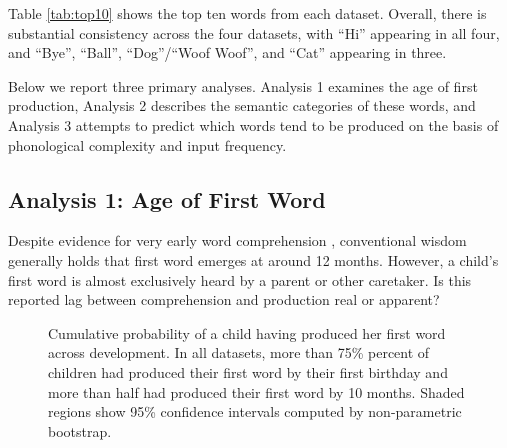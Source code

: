 \documentclass[10pt,letterpaper]{article}
\begin{document}
Table \ref{tab:top10} shows the top ten words from each dataset. Overall, there is substantial consistency across the four datasets, with ``Hi'' appearing in all four, and ``Bye'', ``Ball'', ``Dog''/``Woof Woof'', and ``Cat'' appearing in three.

Below we report three primary analyses. Analysis 1 examines the age of first production, Analysis 2 describes the semantic categories of these words, and Analysis 3 attempts to predict which words tend to be produced on the basis of phonological complexity and input frequency.

\subsection{Analysis 1: Age of First Word} 

Despite evidence for very early word comprehension \cite{tincoff2012,bergelson2012}, conventional wisdom generally holds that first word emerges at around 12 months. However, a child's first word is almost exclusively heard by a parent or other caretaker. Is this reported lag between comprehension and production real or apparent? 



\begin{figure}[t]
\caption{\label{fig:cdfs} Cumulative probability of a child having produced her first word across development. In all datasets, more than 75\% percent of children had produced their first word by their first birthday and more than half had produced their first word by 10 months. Shaded regions show 95\% confidence intervals computed by non-parametric bootstrap.}
\vspace{-2em}
\end{figure}
\end{document}
